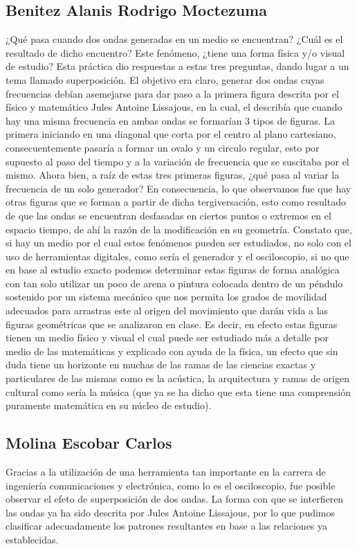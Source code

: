 \documentclass[11pt]{article}
\begin{document}
\begin{multicols}{2}
	\subsection{Benitez Alanis Rodrigo Moctezuma}
	¿Qué pasa cuando dos ondas generadas en un medio se encuentran? ¿Cuál es el resultado de dicho encuentro? Este fenómeno, ¿tiene una forma física y/o visual de estudio?
Esta práctica dio respuestas a estas tres preguntas, dando lugar a un tema llamado superposición. El objetivo era claro, generar dos ondas cuyas frecuencias debían asemejarse para dar paso a la primera figura descrita por el físico y matemático Jules Antoine Lissajous, en la cual, el describía que cuando hay una misma frecuencia en ambas ondas se formarían 3 tipos de figuras. La primera iniciando en una diagonal que corta por el centro al plano cartesiano, consecuentemente pasaría a formar un ovalo y un circulo regular, esto por supuesto al paso del tiempo y a la variación de frecuencia que se suscitaba por el mismo.
Ahora bien, a raíz de estas tres primeras figuras, ¿qué pasa al variar la frecuencia de un solo generador? En consecuencia, lo que observamos fue que hay otras figuras que se forman a partir de dicha tergiversación, esto como resultado de que las ondas se encuentran desfasadas en ciertos puntos o extremos en el espacio tiempo, de ahí la razón de la modificación en su geometría.
Constato que, si hay un medio por el cual estos fenómenos pueden ser estudiados, no solo con el uso de herramientas digitales, como sería el generador y el osciloscopio, si no que en base al estudio exacto podemos determinar estas figuras de forma analógica con tan solo utilizar un poco de arena o pintura colocada dentro de un péndulo sostenido por un sistema mecánico que nos permita los grados de movilidad adecuados para arrastras este al origen del movimiento que darán vida a las figuras geométricas que se analizaron en clase. Es decir, en efecto estas figuras tienen un medio físico y visual el cual puede ser estudiado más a detalle por medio de las matemáticas y explicado con ayuda de la física, un efecto que sin duda tiene un horizonte en muchas de las ramas de las ciencias exactas y particulares de las mismas como es la acústica, la arquitectura y ramas de origen cultural como sería la música (que ya se ha dicho que esta tiene una comprensión puramente matemática en su núcleo de estudio). 

	\subsection{Molina Escobar Carlos}
	Gracias a la utilización de una herramienta tan importante en la carrera de ingeniería comunicaciones y electrónica, como lo es el osciloscopio, fue posible observar el efeto de superposición de dos ondas. La forma con que se interfieren las ondas ya ha sido descrita por Jules Antoine Lissajous, por lo que pudimos clasificar adecuadamente los patrones resultantes en base a las relaciones ya establecidas.


\end{multicols}
\end{document}
